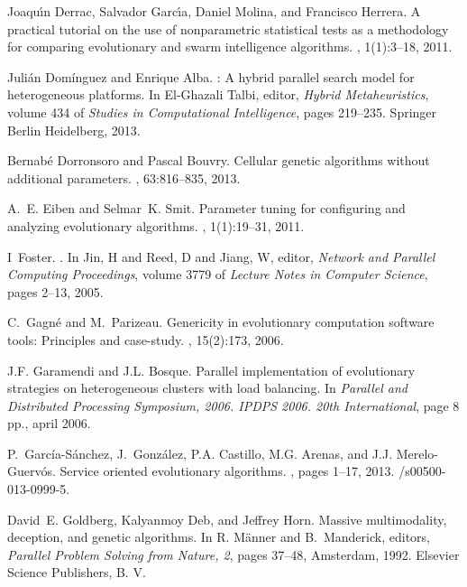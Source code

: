 \begin{thebibliography}{10}
Joaqu\'{\i}n Derrac, Salvador Garc\'{\i}a, Daniel Molina, and Francisco
  Herrera.
\newblock A practical tutorial on the use of nonparametric statistical tests as
  a methodology for comparing evolutionary and swarm intelligence algorithms.
, 1(1):3--18, 2011.

Juli\'an Dom\'inguez and Enrique Alba.
: A hybrid parallel search model for heterogeneous
  platforms.
\newblock In El-Ghazali Talbi, editor, {\em Hybrid Metaheuristics}, volume 434
  of {\em Studies in Computational Intelligence}, pages 219--235. Springer
  Berlin Heidelberg, 2013.

Bernab{\'e} Dorronsoro and Pascal Bouvry.
\newblock Cellular genetic algorithms without additional parameters.
, 63:816--835, 2013.

A.~E. Eiben and Selmar~K. Smit.
\newblock Parameter tuning for configuring and analyzing evolutionary
  algorithms.
, 1(1):19--31, 2011.

I~Foster.
.
\newblock In {Jin, H and Reed, D and Jiang, W}, editor, {\em {Network and
  Parallel Computing Proceedings}}, volume {3779} of {\em {Lecture Notes in
  Computer Science}}, pages {2--13}, 2005.

C.~Gagn{\'e} and M.~Parizeau.
\newblock Genericity in evolutionary computation software tools: Principles and
  case-study.
,
  15(2):173, 2006.

J.F. Garamendi and J.L. Bosque.
\newblock Parallel implementation of evolutionary strategies on heterogeneous
  clusters with load balancing.
\newblock In {\em Parallel and Distributed Processing Symposium, 2006. IPDPS
  2006. 20th International}, page 8 pp., april 2006.

P.~Garc{\'i}a-S{\'a}nchez, J.~Gonz{\'a}lez, P.A. Castillo, M.G. Arenas, and
  J.J. Merelo-Guerv{\'o}s.
\newblock Service oriented evolutionary algorithms.
, pages 1--17, 2013.
/s00500-013-0999-5.

David~E. Goldberg, Kalyanmoy Deb, and Jeffrey Horn.
\newblock Massive multimodality, deception, and genetic algorithms.
\newblock In {R. M\"{a}nner} and B.~Manderick, editors, {\em Parallel Problem
  Solving from Nature, 2}, pages 37--48, Amsterdam, 1992. Elsevier Science
  Publishers, B. V.


\end{thebibliography}
